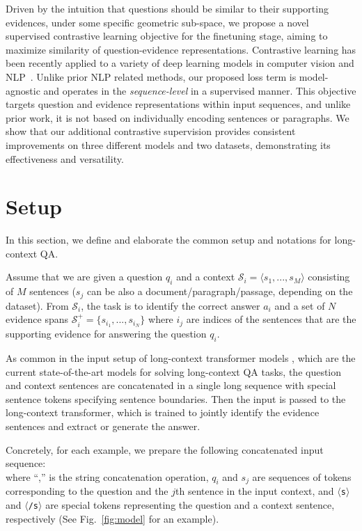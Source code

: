 




Driven by the intuition that questions should be similar to their supporting evidences, under some specific geometric sub-space, we propose a novel supervised contrastive learning objective for the finetuning stage, aiming to maximize similarity of question-evidence representations. Contrastive learning has been recently applied to a variety of deep learning models in computer vision \cite{chen2020simple, chen2021exploring} and NLP~\cite{gao-etal-2021-simcse,gunel2021supervised}. Unlike prior NLP related methods, our proposed loss term is model-agnostic and operates in the \textit{sequence-level} in a supervised manner. This objective targets question and evidence representations within input sequences, and unlike prior work, it is not based on individually encoding sentences or paragraphs.  We show that our additional contrastive supervision provides consistent improvements on three different models and two datasets, demonstrating its effectiveness and versatility. 

\section{Setup}
\label{sec:background}
In this section, we define and elaborate the common setup and notations for long-context QA.

Assume that we are given a question $q_i$ and a context $\mathcal{S}_i{=}\langle {s_1},...,{s_M}\rangle$ consisting of $M$ sentences ($s_j$ can be also a document/paragraph/passage, depending on the dataset). From $\mathcal{S}_i$, the task is to identify the correct answer $a_i$ and a set of $N$ evidence spans $\mathcal{S}^+_i{=}\{s_{i_1},..., s_{i_N}\}$ where $i_j$ are indices of the sentences that are the supporting evidence for answering the question $q_i$. %

As common in the input setup of long-context transformer models \cite{longformer,zaheer2020big,caciularu-etal-2021-cdlm-cross}, which are the current state-of-the-art models for solving long-context QA tasks, 
the question and context sentences are concatenated in a single long sequence with special sentence tokens specifying sentence boundaries. 
Then the input is passed to the long-context transformer, which is trained to jointly identify the evidence sentences and extract or generate the answer.

Concretely, for each example, we prepare the following concatenated input sequence:
\begin{equation*}
[\texttt{$\langle$s$\rangle$},q_i,\texttt{$\langle$/s$\rangle$},s_{1},\texttt{$\langle$/s$\rangle$},s_{2},...,\texttt{$\langle$/s$\rangle$},s_{M}]
\label{eq:input}
\end{equation*}
where ``,'' is the string concatenation operation, $q_i$ and $s_j$ are sequences of tokens corresponding to the question and the $j$th sentence in the input context, and \texttt{$\langle$s$\rangle$} and \texttt{$\langle$/s$\rangle$} are special tokens representing the question and a context sentence, respectively (See Fig.~\ref{fig:model} for an example). %

